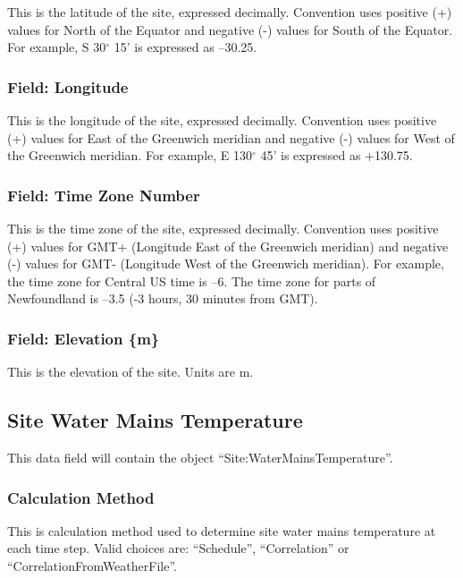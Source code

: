 This is the latitude of the site, expressed decimally. Convention uses positive (+) values for North of the Equator and negative (-) values for South of the Equator. For example, S 30$^{\circ}$ 15' is expressed as --30.25.

\subsubsection{Field: Longitude}\label{field-longitude}

This is the longitude of the site, expressed decimally. Convention uses positive (+) values for East of the Greenwich meridian and negative (-) values for West of the Greenwich meridian. For example, E 130$^{\circ}$ 45' is expressed as +130.75.

\subsubsection{Field: Time Zone Number}\label{field-time-zone-number}

This is the time zone of the site, expressed decimally. Convention uses positive (+) values for GMT+ (Longitude East of the Greenwich meridian) and negative (-) values for GMT- (Longitude West of the Greenwich meridian). For example, the time zone for Central US time is --6. The time zone for parts of Newfoundland is --3.5 (-3 hours, 30 minutes from GMT).

\subsubsection{Field: Elevation \{m\}}\label{field-elevation-m}

This is the elevation of the site. Units are m.

\subsection{Site Water Mains Temperature}\label{site-water-mains-temperature}

This data field will contain the object ``Site:WaterMainsTemperature''.

\subsubsection{Calculation Method}\label{calculation-method}

This is calculation method used to determine site water mains temperature at each time step. Valid choices are: ``Schedule'', ``Correlation'' or ``CorrelationFromWeatherFile''.

